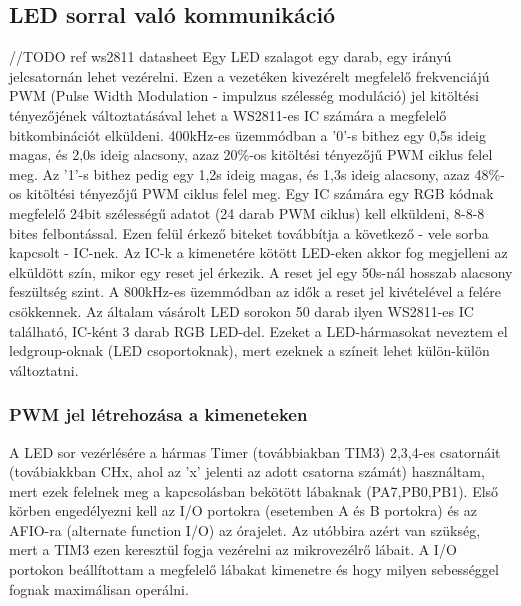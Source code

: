 \documentclass[../main.tex]{subfiles}
\begin{document}
    \subsection{LED sorral való kommunikáció}
        //TODO ref ws2811 datasheet
        Egy LED szalagot egy darab, egy irányú jelcsatornán lehet vezérelni. Ezen a vezetéken kivezérelt megfelelő frekvenciájú PWM (Pulse Width Modulation - impulzus szélesség moduláció) jel kitöltési tényezőjének változtatásával lehet a WS2811-es IC számára a megfelelő bitkombinációt elküldeni. 400kHz-es üzemmódban a '0'-s bithez egy 0,5\micro s ideig magas, és 2,0\micro s ideig alacsony, azaz 20\%-os kitöltési tényezőjű PWM ciklus felel meg. Az '1'-s bithez pedig egy 1,2\micro s ideig magas, és 1,3\micro s ideig alacsony, azaz 48\%-os kitöltési tényezőjű PWM ciklus felel meg. Egy IC számára egy RGB kódnak megfelelő 24bit szélességű adatot (24 darab PWM ciklus) kell elküldeni, 8-8-8 bites felbontással. Ezen felül érkező biteket továbbítja a következő - vele sorba kapcsolt - IC-nek. Az IC-k a kimenetére kötött LED-eken akkor fog megjelleni az elküldött szín, mikor egy reset jel érkezik. A reset jel egy 50\micro s-nál hosszab alacsony feszültség szint. A 800kHz-es üzemmódban az idők a reset jel kivételével a felére csökkennek. 
        Az általam vásárolt LED sorokon 50 darab ilyen WS2811-es IC található, IC-ként 3 darab RGB LED-del. Ezeket a LED-hármasokat neveztem el ledgroup-oknak (LED csoportoknak), mert ezeknek a színeit lehet külön-külön változtatni. 
        
        \subsubsection{PWM jel létrehozása a kimeneteken}
            A LED sor vezérlésére a hármas Timer (továbbiakban TIM3) 2,3,4-es csatornáit (továbiakkban CHx, ahol az 'x' jelenti az adott csatorna számát) használtam, mert ezek felelnek meg a kapcsolásban bekötött lábaknak (PA7,PB0,PB1). Első körben engedélyezni kell az I/O portokra (esetemben A és B portokra) és az AFIO-ra (alternate function I/O) az órajelet. Az utóbbira azért van szükség, mert a TIM3 ezen keresztül fogja vezérelni az mikrovezélrő lábait. A I/O portokon beállítottam a megfelelő lábakat kimenetre és hogy milyen sebességgel fognak maximálisan operálni.
            
\end{document}

